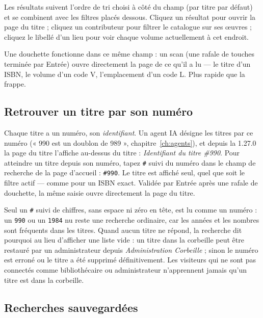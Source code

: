 Les résultats suivent l'ordre de tri choisi à côté du champ (par titre
par défaut) et se combinent avec les filtres placés dessous. Cliquez un
résultat pour ouvrir la page du titre ; cliquez un contributeur pour
filtrer le catalogue sur ses œuvres ; cliquez le libellé d'un lieu pour
voir chaque volume actuellement à cet endroit.

\begin{tip}
Une douchette fonctionne dans ce même champ : un scan (une rafale de
touches terminée par Entrée) ouvre directement la page de ce qu'il a lu
--- le titre d'un ISBN, le volume d'un code V, l'emplacement d'un
code L. Plus rapide que la frappe.
\end{tip}

\subsection{Retrouver un titre par son numéro}\label{sec:title-id-search}

Chaque titre a un numéro, son \emph{identifiant}. Un agent IA désigne
les titres par ce numéro (« 990 est un doublon de 989 »,
chapitre~\ref{ch:agents}), et depuis la 1.27.0 la page du titre
l'affiche au-dessus du titre : \emph{Identifiant du titre \#990}. Pour
atteindre un titre depuis son numéro, tapez \texttt{\#} suivi du numéro
dans le champ de recherche de la page d'accueil : \texttt{\#990}. Le
titre est affiché seul, quel que soit le filtre actif --- comme pour un
ISBN exact. Validée par Entrée après une rafale de douchette, la même
saisie ouvre directement la page du titre.

Seul un \texttt{\#} suivi de chiffres, sans espace ni zéro en tête, est
lu comme un numéro : un \texttt{990} ou un \texttt{1984} nu reste une
recherche ordinaire, car les années et les nombres sont fréquents dans
les titres. Quand aucun titre ne répond, la recherche dit pourquoi au
lieu d'afficher une liste vide : un titre dans la corbeille peut être
restauré par un administrateur depuis \emph{Administration
\textrightarrow{} Corbeille} ; sinon le numéro est erroné ou le titre a
été supprimé définitivement. Les visiteurs qui ne sont pas connectés
comme bibliothécaire ou administrateur n'apprennent jamais qu'un titre
est dans la corbeille.

\subsection{Recherches sauvegardées}\label{sec:saved-searches}


